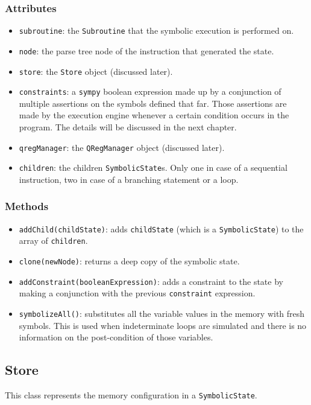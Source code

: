 \documentclass[12pt,a4paper]{report}
\theoremstyle{definition}
\theoremstyle{definition}
\theoremstyle{definition}
\begin{document}
\subsubsection{Attributes}
\begin{itemize}
    \itemsep 0em
    \item \texttt{subroutine}: the \texttt{Subroutine} that the symbolic execution is performed on.
    \item \texttt{node}: the parse tree node of the instruction that generated the state.
    \item \texttt{store}: the \texttt{Store} object (discussed later).
    \item \texttt{constraints}: a \texttt{sympy} boolean expression made up by a conjunction of multiple assertions on the symbols defined that far. Those assertions are made by the execution engine whenever a certain condition occurs in the program. The details will be discussed in the next chapter.
    \item \texttt{qregManager}: the \texttt{QRegManager} object (discussed later).
    \item \texttt{children}: the children \texttt{SymbolicState}s. Only one in case of a sequential instruction, two in case of a branching statement or a loop.
\end{itemize}
\subsubsection{Methods}
\begin{itemize}
    \itemsep 0em
    \item \texttt{addChild(childState)}: adds \texttt{childState} (which is a \texttt{SymbolicState}) to the array of \texttt{children}.
    \item \texttt{clone(newNode)}: returns a deep copy of the symbolic state.
    \item \texttt{addConstraint(booleanExpression)}: adds a constraint to the state by making a conjunction with the previous \texttt{constraint} expression.
    \item \texttt{symbolizeAll()}: substitutes all the variable values in the memory with fresh symbols. This is used when indeterminate loops are simulated and there is no information on the post-condition of those variables.
\end{itemize}

\subsection{Store}
This class represents the memory configuration in a \texttt{SymbolicState}.
\end{document}
